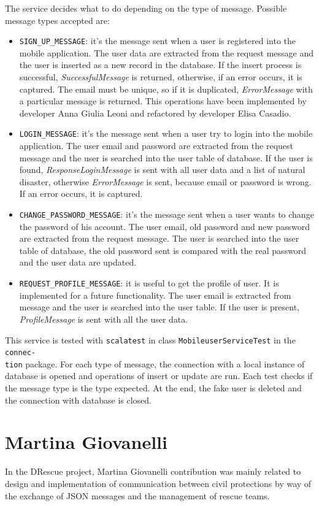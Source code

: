 \documentclass[a4paper,12pt]{report}
\begin{document}
The service decides what to do depending on the type of message. Possible message types accepted are:
\begin{itemize}
\item \texttt{SIGN\_UP\_MESSAGE}: it's the message sent when a user is registered into the mobile application. The user data are extracted from the request message and the user is inserted as a new record in the database. If the insert process is successful, \emph{SuccessfulMessage} is returned, otherwise, if an error occurs, it is captured. The email must be unique, so if it is duplicated, \emph{ErrorMessage} with a particular message is returned. This operations have been implemented by developer Anna Giulia Leoni and refactored by developer Elisa Casadio.
\item \texttt{LOGIN\_MESSAGE}: it's the message sent when a user try to login into the mobile application. The user email and password are extracted from the request message and the user is searched into the user table of database. If the user is found, \emph{ResponseLoginMessage} is sent with all user data and a list of natural disaster, otherwise \emph{ErrorMessage} is sent, because email or password is wrong. If an error occurs, it is captured.
\item \texttt{CHANGE\_PASSWORD\_MESSAGE}: it's the message sent when a user wants to change the password of his account. The user email, old password and new password are extracted from the request message. The user is searched into the user table of database, the old password sent is compared with the real password and the user data are updated.
\item \texttt{REQUEST\_PROFILE\_MESSAGE}: it is useful to get the profile of user. It is implemented for a future functionality. The user email is extracted from message and the user is searched into the user table. If the user is present, \emph{ProfileMessage} is sent with all the user data.
\end{itemize}

This service is tested with \texttt{scalatest} in class \texttt{MobileuserServiceTest} in the \texttt{connec-\\tion} package. For each type of message, the connection with a local instance of database is opened and operations of insert or update are run. Each test checks if the message type is the type expected. At the end, the fake user is deleted and the connection with database is closed.

\section{Martina Giovanelli}
In the DRescue project, Martina Giovanelli contribution was mainly related to design and implementation of communication between civil protections by way of the exchange of JSON messages and the management of rescue teams.
\end{document}
